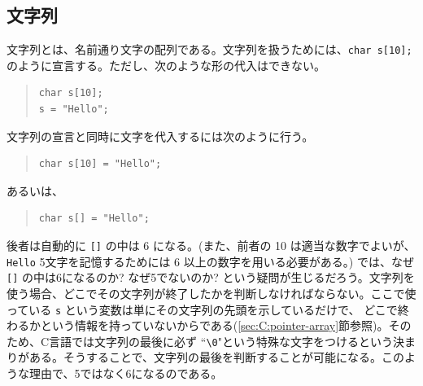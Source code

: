 \subsection{文字列}
文字列とは、名前通り文字の配列である。文字列を扱うためには、\verb|char s[10];| のように宣言する。ただし、次のような形の代入はできない。
%
\begin{quote}
\begin{verbatim}
char s[10];
s = "Hello";
\end{verbatim}
\end{quote}
%
文字列の宣言と同時に文字を代入するには次のように行う。
%
\begin{quote}
\begin{verbatim}
char s[10] = "Hello";
\end{verbatim}
\end{quote}
%
あるいは、
%
\begin{quote}
\begin{verbatim}
char s[] = "Hello";
\end{verbatim}
\end{quote}
%
後者は自動的に \verb|[]| の中は 6 になる。(また、前者の 10 は適当な数字でよいが、\verb|Hello| 5文字を記憶するためには 6 以上の数字を用いる必要がある。) では、なぜ \verb|[]| の中は6になるのか? なぜ5でないのか? という疑問が生じるだろう。文字列を使う場合、どこでその文字列が終了したかを判断しなければならない。ここで使っている \verb|s| という変数は単にその文字列の先頭を示しているだけで、
どこで終わるかという情報を持っていないからである(\ref{sec:C:pointer-array}節参照)。そのため、C言語では文字列の最後に必ず ``\verb|\0|"という特殊な文字をつけるという決まりがある。そうすることで、文字列の最後を判断することが可能になる。このような理由で、5ではなく6になるのである。
\begin{figure}[H]
\begin{center}
\end{center}
\end{figure}

